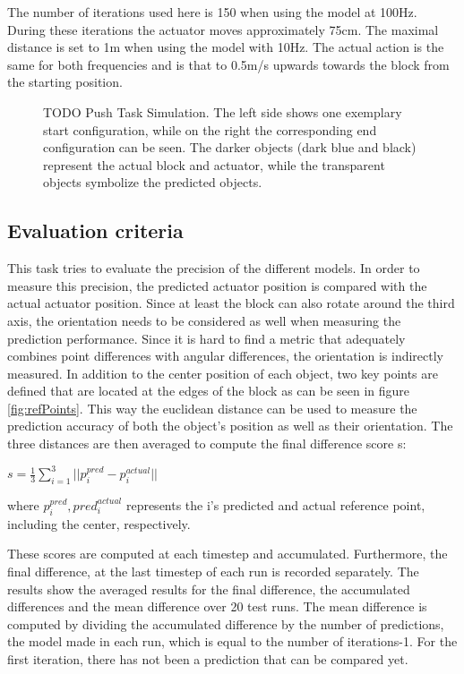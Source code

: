 The number of iterations used here is 150 when using
the model at 100Hz. During these iterations the actuator moves approximately 75cm. The maximal distance is set to 1m when using the
model with 10Hz. The actual action is the same for both frequencies and is that to 0.5m/s upwards towards the block from the starting
position. 

\begin{figure}

\caption{TODO Push Task Simulation. The left side shows one exemplary start configuration, while on the right the corresponding end configuration can be seen.
The darker objects (dark blue and black) represent the actual block and actuator, while the transparent objects symbolize the predicted objects.}
\label{fig:pushTaskSim}
\end{figure}


\subsection{Evaluation criteria}

This task tries to evaluate the precision of the different models. In order to measure this precision, the predicted actuator position
is compared with the actual actuator position. Since at least the block can also rotate around the third axis, the orientation needs to be
considered as well when measuring the prediction performance. Since it is hard to find a metric that adequately combines point differences with
angular differences, the orientation is indirectly measured. In addition to the center position of each object, two key points are defined that
are located at the edges of the block as can be seen in figure \ref{fig:refPoints}. This way the euclidean distance can be used to measure the
prediction accuracy of both the object's position as well as their orientation. The three distances are then averaged to compute the final difference
score s:

\begin{math}
s = \frac{1}{3} \sum\limits_{i=1}^{3}||p^{pred}_i-p^{actual}_i||
\end{math}

where $p^{pred}_i, pred^{actual}_i$ represents the i's predicted and actual reference point, including the center, respectively.

These scores are computed at each timestep and accumulated. Furthermore, the final difference, at the last timestep of each run is recorded separately.
The results show the averaged results for the final difference, the accumulated differences and the mean difference over 20 test runs. The mean difference
is computed by dividing the accumulated difference by the number of predictions, the model made in each run, which is equal to the number of iterations-1. For the
first iteration, there has not been a prediction that can be compared yet.

